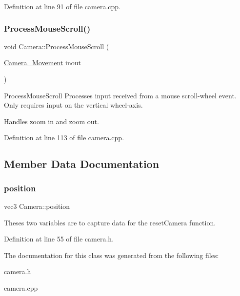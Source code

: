 Definition at line 91 of file camera.\+cpp.

\mbox{\label{classCamera_a17373e11b6b64a0568ce2a03b48ec067}} 
\subsubsection{\texorpdfstring{Process\+Mouse\+Scroll()}{ProcessMouseScroll()}}
{\footnotesize\ttfamily void Camera\+::\+Process\+Mouse\+Scroll (\begin{DoxyParamCaption}\item[{\hyperlink{classCamera_a910e91793a0078a11eef1cba77dec353}{Camera\+\_\+\+Movement}}]{inout }\end{DoxyParamCaption})}



Process\+Mouse\+Scroll Processes input received from a mouse scroll-\/wheel event. Only requires input on the vertical wheel-\/axis. 

Handles zoom in and zoom out. 

Definition at line 113 of file camera.\+cpp.



\subsection{Member Data Documentation}
\mbox{\label{classCamera_a6bd96884fb5fb652b71042f2d7f0122c}} 
\subsubsection{\texorpdfstring{position}{position}}
{\footnotesize\ttfamily vec3 Camera\+::position}

Theses two variables are to capture data for the reset\+Camera function. 

Definition at line 55 of file camera.\+h.



The documentation for this class was generated from the following files\+:\begin{DoxyCompactItemize}
\item 
camera.\+h\item 
camera.\+cpp\end{DoxyCompactItemize}
